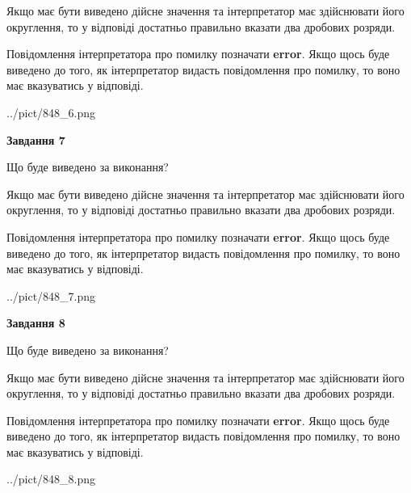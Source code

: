 \documentclass[12pt, ukrainian]{article}
\begin{document}
{\begin {Large}
Якщо має бути виведено дійсне значення та інтерпретатор має здійснювати його округлення, 
то у відповіді достатньо правильно вказати два дробових розряди.

Повідомлення інтерпретатора про помилку позначати \textbf{error}.
Якщо щось буде виведено до того, як інтерпретатор видасть повідомлення про помилку, 
то воно має вказуватись у відповіді. \par

\begin{center}
	{../pict/848_6.png}
\end{center}
\newpage

{\begin {center}\textbf{Завдання 7}\end {center}}\par
Що буде виведено за виконання? \par

Якщо має бути виведено дійсне значення та інтерпретатор має здійснювати його округлення, 
то у відповіді достатньо правильно вказати два дробових розряди.

Повідомлення інтерпретатора про помилку позначати \textbf{error}.
Якщо щось буде виведено до того, як інтерпретатор видасть повідомлення про помилку, 
то воно має вказуватись у відповіді. \par

\begin{center}
	{../pict/848_7.png}
\end{center}
\newpage

{\begin {center}\textbf{Завдання 8}\end {center}}\par
Що буде виведено за виконання? \par

Якщо має бути виведено дійсне значення та інтерпретатор має здійснювати його округлення, 
то у відповіді достатньо правильно вказати два дробових розряди.

Повідомлення інтерпретатора про помилку позначати \textbf{error}.
Якщо щось буде виведено до того, як інтерпретатор видасть повідомлення про помилку, 
то воно має вказуватись у відповіді. \par

\begin{center}
	{../pict/848_8.png}
\end{center}
\newpage


\end{Large}}
\end{document}
